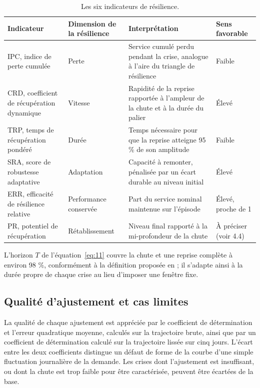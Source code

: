 \begin{table}[htbp]
\caption{Les six indicateurs de résilience.}
\label{tab:d7}
\footnotesize
\begin{tabularx}{\textwidth}{@{}P{3.6cm}P{2.3cm}LP{2.1cm}@{}}
\toprule
\textbf{Indicateur} & \textbf{Dimension de la résilience} & \textbf{Interprétation} & \textbf{Sens favorable} \\
\midrule
IPC, indice de perte cumulée & Perte & Service cumulé perdu pendant la crise, analogue à l'aire du triangle de résilience & Faible \\
CRD, coefficient de récupération dynamique & Vitesse & Rapidité de la reprise rapportée à l'ampleur de la chute et à la durée du palier & Élevé \\
TRP, temps de récupération pondéré & Durée & Temps nécessaire pour que la reprise atteigne 95 \% de son amplitude & Faible \\
SRA, score de robustesse adaptative & Adaptation & Capacité à remonter, pénalisée par un écart durable au niveau initial & Élevé \\
ERR, efficacité de résilience relative & Performance conservée & Part du service nominal maintenue sur l'épisode & Élevé, proche de 1 \\
PR, potentiel de récupération & Rétablissement & Niveau final rapporté à la mi-profondeur de la chute & À préciser (voir 4.4) \\
\bottomrule
\end{tabularx}
\end{table}

L'horizon $T$ de l'équation~\eqref{eq:11} couvre la chute et une reprise complète à environ 98 \%, conformément à la définition proposée en \citep{rahiel2026in4pl} ; il s'adapte ainsi à la durée propre de chaque crise au lieu d'imposer une fenêtre fixe.

\subsection{Qualité d'ajustement et cas limites}
\label{sec:4.4}

La qualité de chaque ajustement est appréciée par le coefficient de détermination et l'erreur quadratique moyenne, calculés sur la trajectoire brute, ainsi que par un coefficient de détermination calculé sur la trajectoire lissée sur cinq jours. L'écart entre les deux coefficients distingue un défaut de forme de la courbe d'une simple fluctuation journalière de la demande. Les crises dont l'ajustement est insuffisant, ou dont la chute est trop faible pour être caractérisée, peuvent être écartées de la base.

